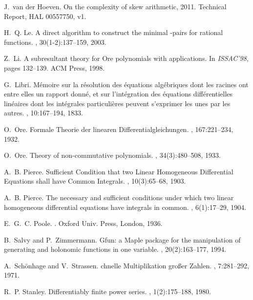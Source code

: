 \documentclass{sig-alt-full}
\def\hoeven#1{{#1}}
\begin{document}
\begin{thebibliography}{10}
J.~\hoeven{van der} Hoeven.
\newblock On the complexity of skew arithmetic, 2011.
\newblock Technical Report, HAL 00557750, v1.

H.~Q. Le.
\newblock A direct algorithm to construct the minimal {}-pairs for rational
  functions.
, 30(1-2):137--159, 2003.

Z.~Li.
\newblock A subresultant theory for {O}re polynomials with applications.
\newblock In {\em ISSAC'98}, pages 132--139. ACM Press, 1998.

G.~Libri.
\newblock M\'emoire sur la r\'esolution des \'equations alg\'ebriques dont les
  racines ont entre elles un rapport donn\'e, et sur l'int\'egration des
  \'equations diff\'erentielles lin\'eaires dont les int\'egrales
  particuli\`eres peuvent s'exprimer les unes par les autres.
, 10:167--194, 1833.

O.~Ore.
\newblock Formale {T}heorie der linearen {D}ifferentialgleichungen.
, 167:221--234, 1932.

O.~Ore.
\newblock Theory of non-commutative polynomials.
, 34(3):480--508, 1933.

A.~B. Pierce.
\newblock Sufficient {C}ondition that two {L}inear {H}omogeneous {D}ifferential
  {E}quations shall have {C}ommon {I}ntegrals.
, 10(3):65--68, 1903.

A.~B. Pierce.
\newblock The necessary and sufficient conditions under which two linear
  homogeneous differential equations have integrals in common.
, 6(1):17--29, 1904.

E.~G.~C. Poole.
.
\newblock Oxford Univ. Press, London, 1936.

B.~Salvy and P.~Zimmermann.
\newblock Gfun: a {M}aple package for the manipulation of generating and
  holonomic functions in one variable.
, 20(2):163--177, 1994.

A.~Sch{\"o}nhage and V.~Strassen.
chnelle {M}ultiplikation gro\ss er {Z}ahlen.
, 7:281--292, 1971.

R.~P. Stanley.
\newblock Differentiably finite power series.
, 1(2):175--188, 1980.


\end{thebibliography}
\end{document}
